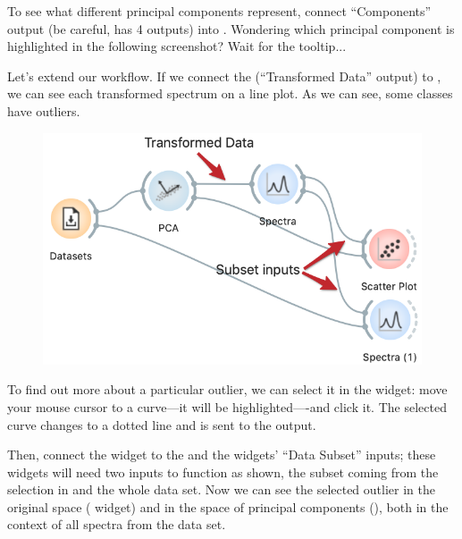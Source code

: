 To see what different principal components represent, connect  ``Components'' output (be careful,  has 4 outputs) into . Wondering which principal component is highlighted in the following screenshot? Wait for the tooltip...

\clearpage

Let's extend our workflow. If we connect the  (``Transformed Data'' output) to , we can see each transformed spectrum on a line plot. As we can see, some classes have outliers.

\begin{figure}
    \includegraphics[scale=0.4]{workflow2.png}
\end{figure}

To find out more about a particular outlier, we can select it in the  widget: move your mouse cursor to a curve---it will be highlighted—-and click it. The selected curve changes to a dotted line and is sent to the output.

Then, connect the  widget to the  and the  widgets' ``Data Subset'' inputs; these widgets will need two inputs to function as shown, the subset coming from the selection in  and the whole data set. Now we can see the selected outlier in the original space ( widget) and in the space of principal components (), both in the context of all spectra from the data set.

